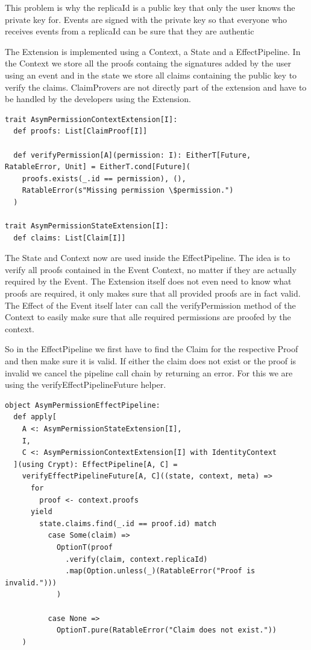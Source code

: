 \documentclass[
	ngerman,
	ruledheaders=section,   %
	class=report,		    %
	thesis={type=bachelor}, %
	accentcolor=9c,			%
	custommargins=true,    %
	marginpar=false,        %
	parskip=half-,          %
	fontsize=11pt,          %
]{tudapub}
\begin{document}
This problem is why the replicaId is a public key that only the user knows the private key for. Events are signed with the private key so that everyone who receives events from a replicaId can be sure that they are authentic

The Extension is implemented using a Context, a State and a EffectPipeline. In the Context we store all the proofs containg the signatures added by the user using an event and in the state we store all claims containing the public key to verify the claims. ClaimProvers are not directly part of the extension and have to be handled by the developers using the Extension.

\begin{lstlisting}
trait AsymPermissionContextExtension[I]:
  def proofs: List[ClaimProof[I]]

  def verifyPermission[A](permission: I): EitherT[Future, RatableError, Unit] = EitherT.cond[Future](
    proofs.exists(_.id == permission), (),
    RatableError(s"Missing permission \$permission.")
  )

trait AsymPermissionStateExtension[I]:
  def claims: List[Claim[I]]
\end{lstlisting}

The State and Context now are used inside the EffectPipeline. The idea is to verify all proofs contained in the Event Context, no matter if they are actually required by the Event. The Extension itself does not even need to know what proofs are required, it only makes sure that all provided proofs are in fact valid. The Effect of the Event itself later can call the verifyPermission method of the Context to easily make sure that alle required permissions are proofed by the context.

So in the EffectPipeline we first have to find the Claim for the respective Proof and then make sure it is valid. If either the claim does not exist or the proof is invalid we cancel the pipeline call chain by returning an error. For this we are using the verifyEffectPipelineFuture helper.

\begin{lstlisting}
object AsymPermissionEffectPipeline:
  def apply[
    A <: AsymPermissionStateExtension[I], 
    I, 
    C <: AsymPermissionContextExtension[I] with IdentityContext
  ](using Crypt): EffectPipeline[A, C] =
    verifyEffectPipelineFuture[A, C]((state, context, meta) =>
      for
        proof <- context.proofs
      yield
        state.claims.find(_.id == proof.id) match
          case Some(claim) => 
            OptionT(proof
              .verify(claim, context.replicaId)
              .map(Option.unless(_)(RatableError("Proof is invalid.")))
            )

          case None => 
            OptionT.pure(RatableError("Claim does not exist."))
    )
\end{lstlisting}
\end{document}
